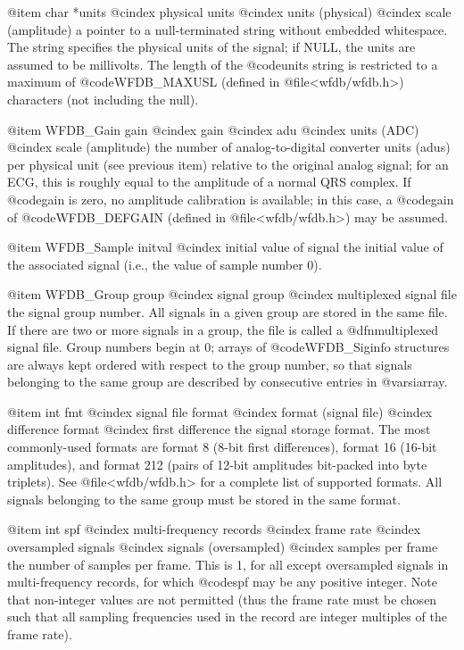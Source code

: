 {{{{{{{{{@item char *units
@cindex physical units
@cindex units (physical)
@cindex scale (amplitude)
a pointer to a null-terminated string without embedded whitespace.  The
string specifies the physical units of the signal; if NULL, the units
are assumed to be millivolts.  The length of the @code{units} string is
restricted to a maximum of @code{WFDB_MAXUSL} (defined in
@file{<wfdb/wfdb.h>}) characters (not including the null).

@item WFDB_Gain gain
@cindex gain
@cindex adu
@cindex units (ADC)
@cindex scale (amplitude)
the number of analog-to-digital converter units (adus) per physical unit
(see previous item) relative to the original analog signal; for an ECG,
this is roughly equal to the amplitude of a normal QRS complex.  If
@code{gain} is zero, no amplitude calibration is available; in this
case, a @code{gain} of @code{WFDB_DEFGAIN} (defined in
@file{<wfdb/wfdb.h>}) may be assumed.

@item WFDB_Sample initval
@cindex initial value of signal
the initial value of the associated signal (i.e., the value of sample
number 0).

@item WFDB_Group group
@cindex signal group
@cindex multiplexed signal file
the signal group number.  All signals in a given group are stored in the
same file.  If there are two or more signals in a group, the file is
called a @dfn{multiplexed signal file}.  Group numbers begin at 0;
arrays of @code{WFDB_Siginfo} structures are always kept ordered with respect
to the group number, so that signals belonging to the same group are
described by consecutive entries in @var{siarray}.

@item int fmt
@cindex signal file format
@cindex format (signal file)
@cindex difference format
@cindex first difference
the signal storage format.  The most commonly-used formats are format 8
(8-bit first differences), format 16 (16-bit amplitudes), and format 212
(pairs of 12-bit amplitudes bit-packed into byte triplets).  See
@file{<wfdb/wfdb.h>} for a complete list of supported formats.  All signals
belonging to the same group must be stored in the same format.

@item int spf
@cindex multi-frequency records
@cindex frame rate
@cindex oversampled signals
@cindex signals (oversampled)
@cindex samples per frame
the number of samples per frame.  This is 1, for all except oversampled
signals in multi-frequency records, for which @code{spf} may be any
positive integer.  Note that non-integer values are not permitted (thus
the frame rate must be chosen such that all sampling frequencies used in
the record are integer multiples of the frame rate).

}}}}}}}}}
